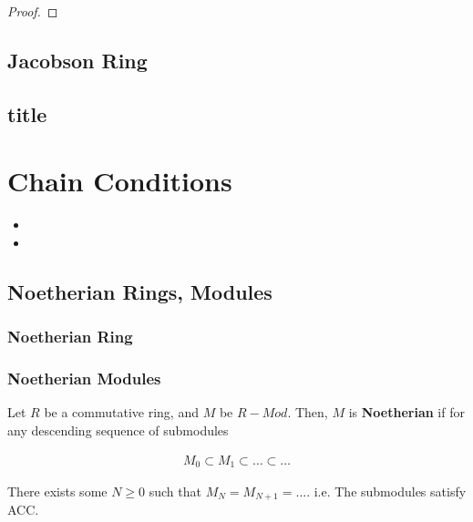\documentclass[Total.tex]{subfiles}
\begin{document}
			\begin{lemma}
			\end{lemma}
			
			\begin{proof}
			\end{proof}
			
		\section{Jacobson Ring}
		
			\begin{Def}
				
			\end{Def}
		\section{title}
	\chapter{Chain Conditions}
		\begin{Def}
			\begin{itemize}
				\item 
				\item 
			\end{itemize}
		\end{Def}
		
		\section{Noetherian Rings, Modules}
			
			\subsection{Noetherian Ring}
				
				\begin{Def}
				\end{Def}
		
			\subsection{Noetherian Modules}
				
				\begin{Def}
					Let $R$ be a commutative ring, and $M$ be $R-Mod$. Then, $M$ is \textbf{Noetherian} if for any descending sequence of submodules
					
					\begin{gather*}
						M_0\subset M_1\subset \dots\subset \dots
					\end{gather*}
					
					There exists some $N\geq 0$ such that $M_{N}=M_{N+1}=\dots$. i.e. The submodules satisfy ACC.
				\end{Def}
				
\end{document}
